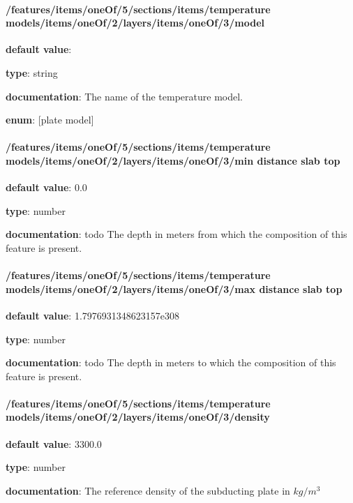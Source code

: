 \paragraph{/features/items/oneOf/5/sections/items/temperature models/items/oneOf/2/layers/items/oneOf/3/model} \begin{itemized}
\item {\bf default value}: 
\item {\bf type}: string
\item {\bf documentation}: The name of the temperature model.
\item {\bf enum}: [plate model]\end{itemized}\paragraph{/features/items/oneOf/5/sections/items/temperature models/items/oneOf/2/layers/items/oneOf/3/min distance slab top} \begin{itemized}
\item {\bf default value}: 0.0
\item {\bf type}: number
\item {\bf documentation}: todo The depth in meters from which the composition of this feature is present.
\end{itemized}\paragraph{/features/items/oneOf/5/sections/items/temperature models/items/oneOf/2/layers/items/oneOf/3/max distance slab top} \begin{itemized}
\item {\bf default value}: 1.7976931348623157e308
\item {\bf type}: number
\item {\bf documentation}: todo The depth in meters to which the composition of this feature is present.
\end{itemized}\paragraph{/features/items/oneOf/5/sections/items/temperature models/items/oneOf/2/layers/items/oneOf/3/density} \begin{itemized}
\item {\bf default value}: 3300.0
\item {\bf type}: number
\item {\bf documentation}: The reference density of the subducting plate in $kg/m^3$

\end{itemized}
